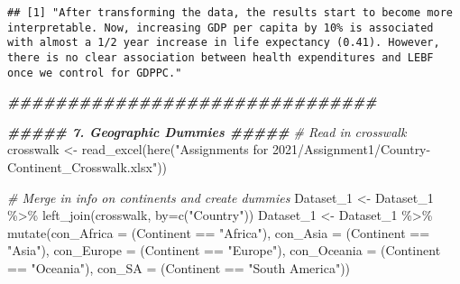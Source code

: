 \documentclass[
]{article}
\newenvironment{Shaded}{\begin{snugshade}}{\end{snugshade}}
\newcommand{\AttributeTok}[1]{\textcolor[rgb]{0.77,0.63,0.00}{#1}}
\newcommand{\CommentTok}[1]{\textcolor[rgb]{0.56,0.35,0.01}{\textit{#1}}}
\newcommand{\DocumentationTok}[1]{\textcolor[rgb]{0.56,0.35,0.01}{\textbf{\textit{#1}}}}
\newcommand{\FunctionTok}[1]{\textcolor[rgb]{0.00,0.00,0.00}{#1}}
\newcommand{\NormalTok}[1]{#1}
\newcommand{\OtherTok}[1]{\textcolor[rgb]{0.56,0.35,0.01}{#1}}
\newcommand{\SpecialCharTok}[1]{\textcolor[rgb]{0.00,0.00,0.00}{#1}}
\newcommand{\StringTok}[1]{\textcolor[rgb]{0.31,0.60,0.02}{#1}}
\begin{document}
\begin{verbatim}
## [1] "After transforming the data, the results start to become more interpretable. Now, increasing GDP per capita by 10% is associated with almost a 1/2 year increase in life expectancy (0.41). However, there is no clear association between health expenditures and LEBF once we control for GDPPC."
\end{verbatim}

\begin{Shaded}
\begin{Highlighting}[]
\DocumentationTok{\#\#\#\#\#\#\#\#\#\#\#\#\#\#\#\#\#\#\#\#\#\#\#\#\#\#\#\#\#\#\#}


\DocumentationTok{\#\#\#\#\# 7. Geographic Dummies \#\#\#\#\#}
\CommentTok{\# Read in crosswalk}
\NormalTok{crosswalk }\OtherTok{\textless{}{-}} \FunctionTok{read\_excel}\NormalTok{(}\FunctionTok{here}\NormalTok{(}\StringTok{"Assignments for 2021/Assignment1/Country{-}Continent\_Crosswalk.xlsx"}\NormalTok{))}

\CommentTok{\# Merge in info on continents and create dummies}
\NormalTok{Dataset\_1 }\OtherTok{\textless{}{-}}\NormalTok{ Dataset\_1 }\SpecialCharTok{\%\textgreater{}\%} \FunctionTok{left\_join}\NormalTok{(crosswalk, }\AttributeTok{by=}\FunctionTok{c}\NormalTok{(}\StringTok{"Country"}\NormalTok{))}
\NormalTok{Dataset\_1 }\OtherTok{\textless{}{-}}\NormalTok{ Dataset\_1 }\SpecialCharTok{\%\textgreater{}\%} 
  \FunctionTok{mutate}\NormalTok{(}\AttributeTok{con\_Africa =}\NormalTok{ (Continent }\SpecialCharTok{==} \StringTok{"Africa"}\NormalTok{),}
         \AttributeTok{con\_Asia =}\NormalTok{ (Continent }\SpecialCharTok{==} \StringTok{"Asia"}\NormalTok{),}
         \AttributeTok{con\_Europe =}\NormalTok{ (Continent }\SpecialCharTok{==} \StringTok{"Europe"}\NormalTok{),}
         \AttributeTok{con\_Oceania =}\NormalTok{ (Continent }\SpecialCharTok{==} \StringTok{"Oceania"}\NormalTok{),}
         \AttributeTok{con\_SA =}\NormalTok{ (Continent }\SpecialCharTok{==} \StringTok{"South America"}\NormalTok{))}


\end{Highlighting}
\end{Shaded}
\end{document}
